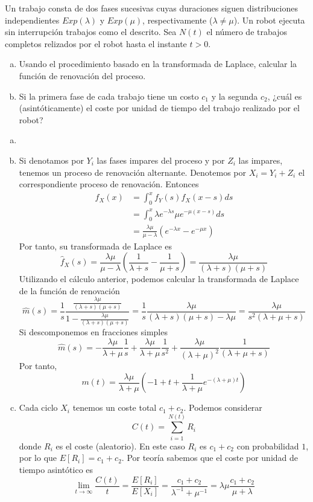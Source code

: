 \documentclass[twoside]{article}
\begin{document}
\newpage
\begin{ejercicio}{2} Un trabajo consta de dos fases sucesivas cuyas duraciones siguen distribuciones independientes $Exp(\lambda)$ y $Exp(\mu)$, respectivamente ($\lambda\neq \mu$). Un robot ejecuta sin interrupción trabajos como el descrito. Sea $N(t)$ el número de trabajos completos relizados por el robot hasta el instante $t>0$.
\begin{enumerate}[a)]
\item Usando el procedimiento basado en la transformada de Laplace, calcular la función de renovación del proceso.
\item Si la primera fase de cada trabajo tiene un costo $c_1$ y la segunda $c_2$, ¿cuál es (asintóticamente) el coste por unidad de tiempo del trabajo realizado por el robot?
\end{enumerate}
\end{ejercicio}
\begin{solucion}
\begin{enumerate}[a)]
\item[]
\item Si denotamos por $Y_i$ las fases impares del proceso y por $Z_i$ las impares, tenemos un proceso de renovación alternante. Denotemos por $X_i = Y_i + Z_i$ el correspondiente proceso de renovación. Entonces
\begin{align*}
f_X(x) &= \int_0^x f_Y(s)f_X(x-s)ds \\
&= \int_0^x \lambda e^{-\lambda s} \mu e^{-\mu(x-s)} ds\\
&= \frac{\lambda\mu}{\mu-\lambda}(e^{-\lambda x}-e^{-\mu x})
\end{align*}
Por tanto, su transformada de Laplace es
$$
\hat{f}_X(s) = \frac{\lambda\mu}{\mu-\lambda}\left(\frac{1}{\lambda + s} - \frac{1}{\mu + s}\right) = \frac{\lambda\mu}{(\lambda+s)(\mu+s)}
$$
Utilizando el cálculo anterior, podemos calcular la transformada de Laplace de la función de renovación
$$
\hat{m}(s) = \frac{1}{s}\frac{\frac{\lambda\mu}{(\lambda+s)(\mu+s)}}{1-\frac{\lambda\mu}{(\lambda+s)(\mu+s)}} = \frac{1}{s}\frac{\lambda\mu}{(\lambda+s)(\mu+s) - \lambda\mu} = \frac{\lambda\mu}{s^2(\lambda+\mu+s)}
$$
Si descomponemos en fracciones simples
$$
\hat{m}(s) = -\frac{\lambda\mu}{\lambda+\mu}\frac{1}{s}+\frac{\lambda\mu}{\lambda+\mu}\frac{1}{s^2} + \frac{\lambda\mu}{(\lambda+\mu)^2}\frac{1}{(\lambda+\mu + s)}
$$
Por tanto,
$$
m(t) = \frac{\lambda\mu}{\lambda+\mu}\left(-1 + t+ \frac{1}{\lambda + \mu}e^{-(\lambda+\mu)t}\right)
$$
\item Cada ciclo $X_i$ tenemos un coste total $c_1+c_2$. Podemos considerar
$$
C(t) = \sum_{i=1}^{N(t)} R_i
$$
donde $R_i$ es el coste (aleatorio). En este caso $R_i$ es $c_1+c_2$ con probabilidad $1$, por lo que $E[R_i] = c_1+c_2$. Por teoría sabemos que el coste por unidad de tiempo asintótico es
$$
\lim_{t\to \infty} \frac{C(t)}{t} = \frac{E[R_i]}{E[X_i]} = \frac{c_1+c_2}{\lambda^{-1}+\mu^{-1}} = \lambda\mu \frac{c_1+c_2}{\mu+\lambda}
$$
\end{enumerate}
\end{solucion}
\end{document}
